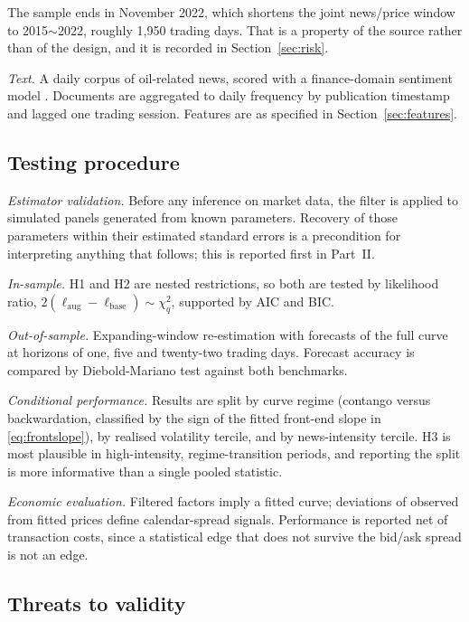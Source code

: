 \documentclass[journal]{IEEEtran}
\newcommand{\rng}{\ensuremath{\sim}}
\begin{document}
The sample ends in November 2022, which shortens the joint news/price window to 2015\rng{}2022, roughly 1{,}950 trading days. That is a property of the source rather than of the design, and it is recorded in Section~\ref{sec:risk}.

\emph{Text.} A daily corpus of oil-related news, scored with a finance-domain sentiment model \cite{Araci2019}. Documents are aggregated to daily frequency by publication timestamp and lagged one trading session. Features are as specified in Section~\ref{sec:features}.

\subsection{Testing procedure}

\emph{Estimator validation.} Before any inference on market data, the filter is applied to simulated panels generated from known parameters. Recovery of those parameters within their estimated standard errors is a precondition for interpreting anything that follows; this is reported first in Part~II.

\emph{In-sample.} H1 and H2 are nested restrictions, so both are tested by likelihood ratio, $2(\ell_{\text{aug}} - \ell_{\text{base}}) \sim \chi^2_q$, supported by AIC and BIC.

\emph{Out-of-sample.} Expanding-window re-estimation with forecasts of the full curve at horizons of one, five and twenty-two trading days. Forecast accuracy is compared by Diebold-Mariano test against both benchmarks.

\emph{Conditional performance.} Results are split by curve regime (contango versus backwardation, classified by the sign of the fitted front-end slope in \eqref{eq:frontslope}), by realised volatility tercile, and by news-intensity tercile. H3 is most plausible in high-intensity, regime-transition periods, and reporting the split is more informative than a single pooled statistic.

\emph{Economic evaluation.} Filtered factors imply a fitted curve; deviations of observed from fitted prices define calendar-spread signals. Performance is reported net of transaction costs, since a statistical edge that does not survive the bid/ask spread is not an edge.

\subsection{Threats to validity}
\end{document}
